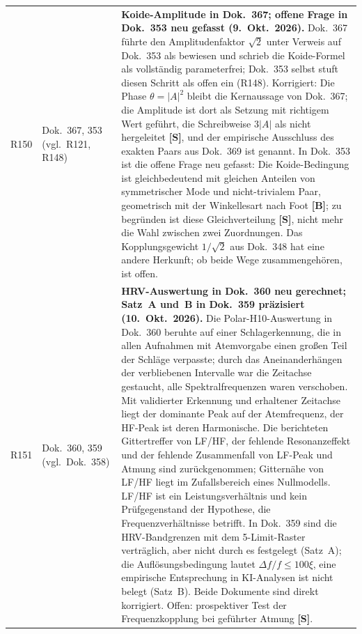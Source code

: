 \begin{longtable}{@{}p{0.9cm}p{3.1cm}p{10.2cm}@{}}
R150 & Dok.~367, 353 (vgl.\ R121, R148) & \textbf{Koide-Amplitude in Dok.~367; offene Frage in Dok.~353 neu gefasst (9.~Okt.~2026).} Dok.~367 führte den Amplitudenfaktor $\sqrt2$ unter Verweis auf Dok.~353 als bewiesen und schrieb die Koide-Formel als vollständig parameterfrei; Dok.~353 selbst stuft diesen Schritt als offen ein (R148). Korrigiert: Die Phase $\theta=|A|^2$ bleibt die Kernaussage von Dok.~367; die Amplitude ist dort als Setzung mit richtigem Wert geführt, die Schreibweise $3|A|$ als nicht hergeleitet \textbf{[S]}, und der empirische Ausschluss des exakten Paars aus Dok.~369 ist genannt. In Dok.~353 ist die offene Frage neu gefasst: Die Koide-Bedingung ist gleichbedeutend mit gleichen Anteilen von symmetrischer Mode und nicht-trivialem Paar, geometrisch mit der Winkellesart nach Foot \textbf{[B]}; zu begründen ist diese Gleichverteilung \textbf{[S]}, nicht mehr die Wahl zwischen zwei Zuordnungen. Das Kopplungsgewicht $1/\sqrt2$ aus Dok.~348 hat eine andere Herkunft; ob beide Wege zusammengehören, ist offen. \\
R151 & Dok.~360, 359 (vgl.\ Dok.~358) & \textbf{HRV-Auswertung in Dok.~360 neu gerechnet; Satz~A und~B in Dok.~359 präzisiert (10.~Okt.~2026).} Die Polar-H10-Auswertung in Dok.~360 beruhte auf einer Schlagerkennung, die in allen Aufnahmen mit Atemvorgabe einen großen Teil der Schläge verpasste; durch das Aneinanderhängen der verbliebenen Intervalle war die Zeitachse gestaucht, alle Spektralfrequenzen waren verschoben. Mit validierter Erkennung und erhaltener Zeitachse liegt der dominante Peak auf der Atemfrequenz, der HF-Peak ist deren Harmonische. Die berichteten Gittertreffer von LF/HF, der fehlende Resonanzeffekt und der fehlende Zusammenfall von LF-Peak und Atmung sind zurückgenommen; Gitternähe von LF/HF liegt im Zufallsbereich eines Nullmodells. LF/HF ist ein Leistungsverhältnis und kein Prüfgegenstand der Hypothese, die Frequenzverhältnisse betrifft. In Dok.~359 sind die HRV-Bandgrenzen mit dem 5-Limit-Raster verträglich, aber nicht durch es festgelegt (Satz~A); die Auflösungsbedingung lautet $\Delta f/f\le100\xi$, eine empirische Entsprechung in KI-Analysen ist nicht belegt (Satz~B). Beide Dokumente sind direkt korrigiert. Offen: prospektiver Test der Frequenzkopplung bei geführter Atmung \textbf{[S]}. \\

\end{longtable}

